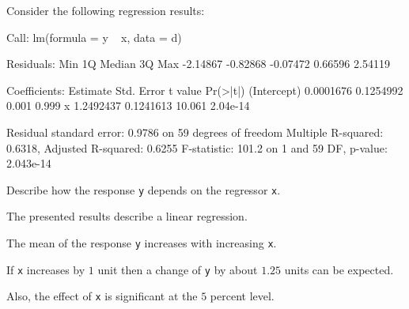 
\begin{question}
Consider the following regression results:

\begin{Schunk}
\begin{Soutput}
Call:
lm(formula = y ~ x, data = d)

Residuals:
     Min       1Q   Median       3Q      Max 
-2.14867 -0.82868 -0.07472  0.66596  2.54119 

Coefficients:
             Estimate Std. Error t value Pr(>|t|)
(Intercept) 0.0001676  0.1254992   0.001    0.999
x           1.2492437  0.1241613  10.061 2.04e-14

Residual standard error: 0.9786 on 59 degrees of freedom
Multiple R-squared:  0.6318,	Adjusted R-squared:  0.6255 
F-statistic: 101.2 on 1 and 59 DF,  p-value: 2.043e-14
\end{Soutput}
\end{Schunk}

Describe how the response \texttt{y} depends on the regressor \texttt{x}.
\end{question}

\begin{solution}
The presented results describe a linear regression.

The mean of the response \texttt{y} increases with increasing \texttt{x}.

If \texttt{x} increases by $1$ unit then a change of \texttt{y} by about $1.25$ units can be expected.

Also, the effect of \texttt{x} is  significant at the $5$ percent level.
\end{solution}


